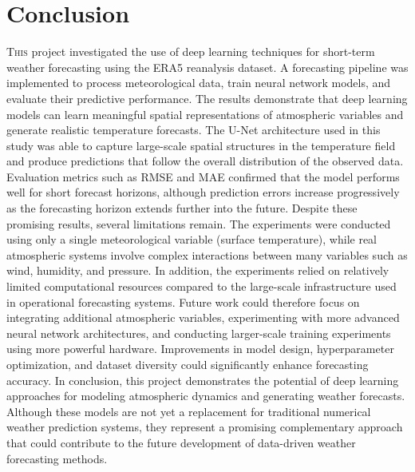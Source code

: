 \chapter{Conclusion}
\label{chap:conclusiones}

\lettrine{T}{his} project investigated the use of deep learning techniques for short-term weather forecasting using the ERA5 reanalysis dataset. A forecasting pipeline was implemented to process meteorological data, train neural network models, and evaluate their predictive performance.
The results demonstrate that deep learning models can learn meaningful spatial representations of atmospheric variables and generate realistic temperature forecasts. The U-Net architecture used in this study was able to capture large-scale spatial structures in the temperature field and produce predictions that follow the overall distribution of the observed data. Evaluation metrics such as RMSE and MAE confirmed that the model performs well for short forecast horizons, although prediction errors increase progressively as the forecasting horizon extends further into the future.
Despite these promising results, several limitations remain. The experiments were conducted using only a single meteorological variable (surface temperature), while real atmospheric systems involve complex interactions between many variables such as wind, humidity, and pressure. In addition, the experiments relied on relatively limited computational resources compared to the large-scale infrastructure used in operational forecasting systems.
Future work could therefore focus on integrating additional atmospheric variables, experimenting with more advanced neural network architectures, and conducting larger-scale training experiments using more powerful hardware. Improvements in model design, hyperparameter optimization, and dataset diversity could significantly enhance forecasting accuracy.
In conclusion, this project demonstrates the potential of deep learning approaches for modeling atmospheric dynamics and generating weather forecasts. Although these models are not yet a replacement for traditional numerical weather prediction systems, they represent a promising complementary approach that could contribute to the future development of data-driven weather forecasting methods.

